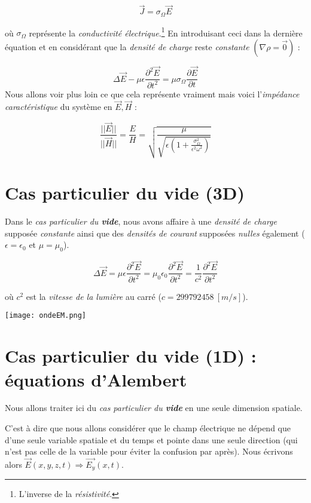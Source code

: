 \[\vec{J} = \sigma_{\Omega} \vec{E} \]

où $\sigma_{\Omega}$ représente la \textit{conductivité électrique}.\footnote{L'inverse de la \textit{résistivité}.} En introduisant ceci dans la dernière équation et en considérant que la
\textit{densité de charge} reste \textit{constante} $(\nabla \rho=\vec{0})$ :

\[ \Delta \vec{E} - \mu \epsilon  \frac{\partial^{2} \vec{E}}{\partial t^{2}} = \mu \sigma_{\Omega} \frac{\partial \vec{E}}{\partial t} \]
Nous allons voir plus loin ce que cela représente vraiment mais voici l'\textit{impédance caractéristique} du système en $\vec{E},\vec{H}$ : 

\[ \frac{|| \vec{E} ||}{|| \vec{H} ||} =  \frac{E}{H} =\sqrt{\frac{\mu}{\sqrt{\epsilon(1+\frac{\sigma_{\Omega}^{2}}{\epsilon^{2} \omega^{2}})}}}\]

\section{Cas particulier du vide (3D)} 

Dans le \textit{cas particulier du \textbf{vide}}, nous avons affaire à une \textit{densité de charge} supposée \textit{constante} ainsi que des \textit{densités de courant} supposées \textit{nulles} également
($\epsilon = \epsilon_{0}$ et $\mu = \mu_{0}$).

\[ \Delta \vec{E} = \mu \epsilon  \frac{\partial^{2} \vec{E}}{\partial t^{2}} = \mu_{0} \epsilon_{0}  \frac{\partial^{2} \vec{E}}{\partial t^{2}} =\frac{1}{c^{2}} \frac{\partial^{2} \vec{E}}{\partial t^{2}} \]

où $c^{2}$ est la \textit{vitesse de la lumière} au carré ($c = \SI{299 792 458}{[m/s]}$).

\begin{center}
\texttt{[image: ondeEM.png]}
\end{center}


\section{Cas particulier du vide (1D) : équations d'Alembert}

Nous allons traiter ici du \textit{cas particulier du \textbf{vide}} en une seule dimension spatiale.

C'est à dire que nous allons considérer que le champ électrique ne dépend que d'une seule variable spatiale et du temps et pointe dans une seule direction (qui n'est pas celle de la variable pour éviter la confusion par après).
Nous écrivons alors $\vec{E}(x,y,z,t) \Rightarrow \vec{E_{y}}(x,t)$.

